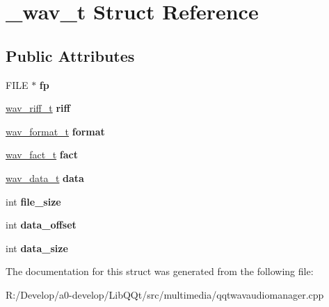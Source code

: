 \hypertarget{struct__wav__t}{}\section{\+\_\+wav\+\_\+t Struct Reference}
\label{struct__wav__t}
\subsection*{Public Attributes}
\begin{DoxyCompactItemize}
\item 
\mbox{\label{struct__wav__t_ac00d43651b4590fe75f6c613916513e9}} 
F\+I\+LE $\ast$ {\bfseries fp}
\item 
\mbox{\label{struct__wav__t_a18fe5a3da0bc26d2f78407082f1faa9b}} 
\mbox{\hyperlink{struct__wav__riff__t}{wav\+\_\+riff\+\_\+t}} {\bfseries riff}
\item 
\mbox{\label{struct__wav__t_a6617acba352a7e3177ade83879e7ddd0}} 
\mbox{\hyperlink{struct__wav__format__t}{wav\+\_\+format\+\_\+t}} {\bfseries format}
\item 
\mbox{\label{struct__wav__t_a9ce09de05ea16bbda7f6a23e06f1c24f}} 
\mbox{\hyperlink{struct__wav__fact__t}{wav\+\_\+fact\+\_\+t}} {\bfseries fact}
\item 
\mbox{\label{struct__wav__t_af95a81183d70cd3ab55a459eb08e8cb1}} 
\mbox{\hyperlink{struct__wav__data__t}{wav\+\_\+data\+\_\+t}} {\bfseries data}
\item 
\mbox{\label{struct__wav__t_a208fcf57f2f7c255d5a920075fe5cc62}} 
int {\bfseries file\+\_\+size}
\item 
\mbox{\label{struct__wav__t_a1b678c6a7ce0c1de623fbf437f0ff23c}} 
int {\bfseries data\+\_\+offset}
\item 
\mbox{\label{struct__wav__t_a52863ebf694514743bdbd8c8be08ea9b}} 
int {\bfseries data\+\_\+size}
\end{DoxyCompactItemize}


The documentation for this struct was generated from the following file\+:\begin{DoxyCompactItemize}
\item 
R\+:/\+Develop/a0-\/develop/\+Lib\+Q\+Qt/src/multimedia/qqtwavaudiomanager.\+cpp\end{DoxyCompactItemize}

